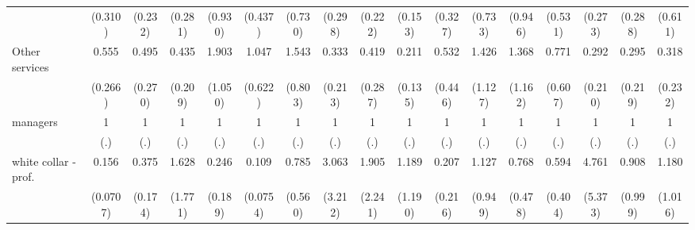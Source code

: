 {\begin{tabular}{l*{16}{c}}
                    &     (0.310)         &     (0.232)         &     (0.281)         &     (0.930)         &     (0.437)         &     (0.730)         &     (0.298)         &     (0.222)         &     (0.153)         &     (0.327)         &     (0.733)         &     (0.946)         &     (0.531)         &     (0.273)         &     (0.288)         &     (0.611)         \\
[1em]
Other services      &       0.555         &       0.495         &       0.435         &       1.903         &       1.047         &       1.543         &       0.333         &       0.419         &       0.211\sym{*}  &       0.532         &       1.426         &       1.368         &       0.771         &       0.292         &       0.295         &       0.318         \\
                    &     (0.266)         &     (0.270)         &     (0.209)         &     (1.050)         &     (0.622)         &     (0.803)         &     (0.213)         &     (0.287)         &     (0.135)         &     (0.446)         &     (1.127)         &     (1.162)         &     (0.607)         &     (0.210)         &     (0.219)         &     (0.232)         \\
[1em]
managers            &           1         &           1         &           1         &           1         &           1         &           1         &           1         &           1         &           1         &           1         &           1         &           1         &           1         &           1         &           1         &           1         \\
                    &         (.)         &         (.)         &         (.)         &         (.)         &         (.)         &         (.)         &         (.)         &         (.)         &         (.)         &         (.)         &         (.)         &         (.)         &         (.)         &         (.)         &         (.)         &         (.)         \\
[1em]
white collar - prof.&       0.156\sym{***}&       0.375\sym{*}  &       1.628         &       0.246         &       0.109\sym{**} &       0.785         &       3.063         &       1.905         &       1.189         &       0.207         &       1.127         &       0.768         &       0.594         &       4.761         &       0.908         &       1.180         \\
                    &    (0.0707)         &     (0.174)         &     (1.771)         &     (0.189)         &    (0.0754)         &     (0.560)         &     (3.212)         &     (2.241)         &     (1.190)         &     (0.216)         &     (0.949)         &     (0.478)         &     (0.404)         &     (5.373)         &     (0.999)         &     (1.016)         \\

\end{tabular}}
